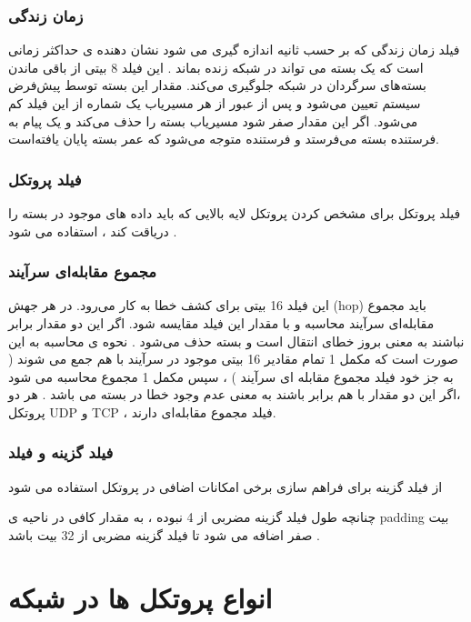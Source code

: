\documentclass[12pt]{book}
\begin{document}
\subsubsection{زمان زندگی }

فیلد زمان زندگی که بر حسب ثانیه اندازه گیری می شود نشان دهنده ی حداکثر زمانی است که یک بسته 
می تواند در شبکه زنده بماند .
 این فیلد 8 بیتی از باقی ماندن بسته‌های سرگردان 
  در شبکه جلوگیری می‌کند. مقدار این بسته توسط پیش‌فرض سیستم تعیین می‌شود و پس از عبور از هر مسیریاب یک شماره از این فیلد کم می‌شود. اگر این مقدار صفر شود مسیریاب بسته را حذف می‌کند و یک پیام
   به فرستنده بسته می‌فرستد و فرستنده متوجه می‌شود که عمر بسته پایان یافته‌است.


\subsubsection{فیلد پروتکل}

فیلد پروتکل برای مشخص کردن پروتکل لایه بالایی که باید داده های موجود در بسته
را دریاقت کند ، استفاده می شود .


\subsubsection{مجموع مقابله‌ای سرآیند }

این فیلد  16 بیتی برای کشف خطا به کار می‌رود. در هر جهش (hop) باید مجموع مقابله‌ای سرآیند محاسبه و با مقدار این فیلد مقایسه شود. اگر این دو مقدار برابر نباشند به معنی بروز خطای انتقال است و بسته حذف می‌شود .
نحوه ی محاسبه به این صورت است که مکمل 1 تمام مقادیر 16 بیتی موجود در سرآیند 
با هم جمع می شوند ( به جز خود فیلد مجموع مقابله ای سرآیند ) ، سپس مکمل 1 مجموع محاسبه می شود ،اگر این دو مقدار با هم برابر باشند به معنی عدم وجود خطا در بسته می باشد . هر دو پروتکل UDP و TCP ، فیلد مجموع مقابله‌ای دارند.


\subsubsection{فیلد گزینه و فیلد }

از فیلد گزینه برای فراهم سازی برخی امکانات اضافی در پروتکل 
استفاده می شود 

چنانچه طول فیلد گزینه مضربی از 4 نبوده ، به مقدار کافی در ناحیه ی
 padding 
بیت صفر اضافه می شود تا فیلد گزینه مضربی از 32 بیت باشد .

\section{انواع پروتکل ها در شبکه}
\end{document}
